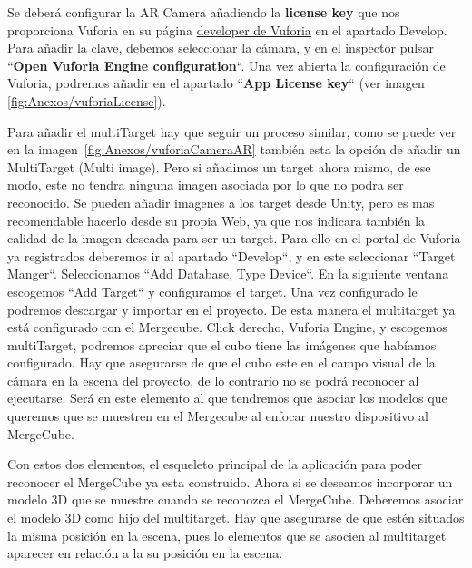 Se deberá configurar la AR Camera añadiendo la \textbf{license key} que nos proporciona Vuforia en su página \href{https://developer.vuforia.com/license-manager}{developer de Vuforia} en el apartado Develop. Para añadir la clave, debemos seleccionar la cámara, y en el inspector pulsar ``\textbf{Open Vuforia Engine configuration}``. Una vez abierta la configuración de Vuforia, podremos añadir en el apartado ``\textbf{App License key}`` (ver imagen \ref{fig:Anexos/vuforiaLicense}). 



Para añadir el multiTarget hay que seguir un proceso similar, como se puede ver en la imagen~\ref{fig:Anexos/vuforiaCameraAR} también esta la opción de añadir un MultiTarget (Multi image). Pero si añadimos un target ahora mismo, de ese modo, este no tendra ninguna imagen asociada por lo que no podra ser reconocido. Se pueden añadir imagenes a los target desde Unity, pero es mas recomendable hacerlo desde su propia Web, ya que nos indicara también la calidad de la imagen deseada para ser un target. Para ello en el portal de Vuforia ya registrados deberemos ir al apartado ``Develop``, y en este seleccionar ``Target Manger``. Seleccionamos ``Add Database, Type Device``. En la siguiente ventana escogemos ``Add Target`` y configuramos el target. Una vez configurado le podremos descargar y importar en el proyecto. De esta manera el multitarget ya está configurado con el Mergecube. Click derecho, Vuforia Engine, y escogemos multiTarget, podremos apreciar que el cubo tiene las imágenes que habíamos configurado. Hay que asegurarse de que el cubo este en el campo visual de la cámara en la escena del proyecto, de lo contrario no se podrá reconocer al ejecutarse. Será en este elemento al que tendremos que asociar los modelos que queremos que se muestren en el Mergecube al enfocar nuestro dispositivo al MergeCube.


Con estos dos elementos, el esqueleto principal de la aplicación para poder reconocer el MergeCube ya esta construido. Ahora si se deseamos incorporar un modelo 3D que se muestre cuando se reconozca el MergeCube. Deberemos asociar el modelo 3D como hijo del multitarget. Hay que asegurarse de que estén situados la misma posición en la escena, pues lo elementos que se asocien al multitarget aparecer en relación a la su posición en la escena.


